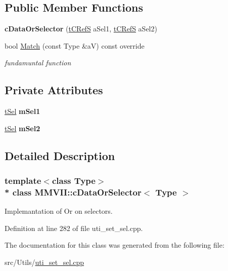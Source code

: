 \subsection*{Public Member Functions}
\begin{DoxyCompactItemize}
\item 
{\bfseries c\+Data\+Or\+Selector} (\hyperlink{classMMVII_1_1cSelector}{t\+C\+RefS} a\+Sel1, \hyperlink{classMMVII_1_1cSelector}{t\+C\+RefS} a\+Sel2)\hypertarget{classMMVII_1_1cDataOrSelector_a70e6ba189ddde5fe8dc932d02179989a}{}\label{classMMVII_1_1cDataOrSelector_a70e6ba189ddde5fe8dc932d02179989a}

\item 
bool \hyperlink{classMMVII_1_1cDataOrSelector_aaada146960a47b12fd300f1c564f53af}{Match} (const Type \&aV) const override\hypertarget{classMMVII_1_1cDataOrSelector_aaada146960a47b12fd300f1c564f53af}{}\label{classMMVII_1_1cDataOrSelector_aaada146960a47b12fd300f1c564f53af}

\begin{DoxyCompactList}\small\item\em fundamuntal function \end{DoxyCompactList}\end{DoxyCompactItemize}
\subsection*{Private Attributes}
\begin{DoxyCompactItemize}
\item 
\hyperlink{classMMVII_1_1cSelector}{t\+Sel} {\bfseries m\+Sel1}\hypertarget{classMMVII_1_1cDataOrSelector_a0286ff547c5a96afa343b97b023dd49b}{}\label{classMMVII_1_1cDataOrSelector_a0286ff547c5a96afa343b97b023dd49b}

\item 
\hyperlink{classMMVII_1_1cSelector}{t\+Sel} {\bfseries m\+Sel2}\hypertarget{classMMVII_1_1cDataOrSelector_abf02a4392914a219808a83ff708d5d1f}{}\label{classMMVII_1_1cDataOrSelector_abf02a4392914a219808a83ff708d5d1f}

\end{DoxyCompactItemize}


\subsection{Detailed Description}
\subsubsection*{template$<$class Type$>$\\*
class M\+M\+V\+I\+I\+::c\+Data\+Or\+Selector$<$ Type $>$}

Implemantation of Or on selectors. 

Definition at line 282 of file uti\+\_\+set\+\_\+sel.\+cpp.



The documentation for this class was generated from the following file\+:\begin{DoxyCompactItemize}
\item 
src/\+Utils/\hyperlink{uti__set__sel_8cpp}{uti\+\_\+set\+\_\+sel.\+cpp}\end{DoxyCompactItemize}
